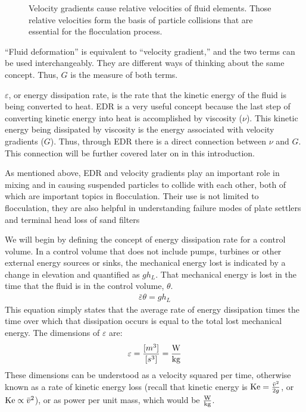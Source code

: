 \documentclass[letterpaper,10pt,english]{sphinxmanual}
\let\sphinxpxdimen\pdfpxdimen\else\newdimen\sphinxpxdimen
\begin{document}
\begin{figure}[htbp]
\centering
\capstart

\noindent\sphinxincludegraphics[width=700\sphinxpxdimen]{{Velocity_gradient_image}.jpg}
\caption{Velocity gradients cause relative velocities of fluid elements. Those relative velocities form the basis of particle collisions that are essential for the flocculation process.}\label{\detokenize{Rapid_Mix/RM_Intro:id13}}\label{\detokenize{Rapid_Mix/RM_Intro:figure-velocity-gradient-image}}\end{figure}

 “Fluid deformation” is equivalent to “velocity gradient,” and the two terms can be used interchangeably. They are different ways of thinking about the same concept. Thus, \(G\) is the measure of both terms.

\(\varepsilon\), or energy dissipation rate, is the rate that the kinetic energy of the fluid is being converted to heat. EDR is a very useful concept because the last step of converting kinetic energy into heat is accomplished by viscosity (\(\nu\)). This kinetic energy being dissipated by viscosity is the energy associated with velocity gradients (\(G\)). Thus, through EDR there is a direct connection between \(\nu\) and \(G\). This connection will be further covered later on in this introduction.

As mentioned above, EDR and velocity gradients play an important role in mixing and in causing suspended particles to collide with each other, both of which are important topics in flocculation. Their use is not limited to flocculation, they are also helpful in understanding failure modes of plate settlers and terminal head loss of sand filters

We will begin by defining the concept of energy dissipation rate for a control volume. In a control volume that does not include pumps, turbines or other external energy sources or sinks, the mechanical energy lost is indicated by a change in elevation and quantified as \(g h_L\). That mechanical energy is lost in the time that the fluid is in the control volume, \(\theta\).
\begin{equation}\label{equation:Rapid_Mix/RM_Intro:Rapid_Mix/RM_Intro:10}
\begin{split}\bar\varepsilon \theta = g h_L\end{split}
\end{equation}
This equation simply states that the average rate of energy dissipation times the time over which that dissipation occurs is equal to the total lost mechanical energy. The dimensions of \(\varepsilon\) are:
\begin{equation}\label{equation:Rapid_Mix/RM_Intro:Rapid_Mix/RM_Intro:11}
\begin{split}\varepsilon = \frac{[m^3]}{[s^3]} = {\rm \frac{W}{kg}}\end{split}
\end{equation}
These dimensions can be understood as a velocity squared per time, otherwise known as a rate of kinetic energy loss (recall that kinetic energy is \({\rm Ke} = \frac{\bar v^2}{2g}\), or \({\rm Ke} \propto \bar v^2\)), or as power per unit mass, which would be \({\rm  \frac{W}{kg}}\).
\end{document}
